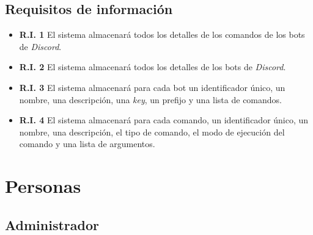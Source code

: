 \subsection{Requisitos de información}

\begin{itemize}
	\item \textbf{R.I. 1} El sistema almacenará todos los detalles de los comandos de los bots de \textit{Discord}.
	\item \textbf{R.I. 2} El sistema almacenará todos los detalles de los bots de \textit{Discord}.
	\item \textbf{R.I. 3} El sistema almacenará para cada bot un identificador único, un nombre, una descripción, una \textit{key}, un prefijo y una lista de comandos.
	\item \textbf{R.I. 4} El sistema almacenará para cada comando, un identificador único, un nombre, una descripción, el tipo de comando, el modo de ejecución del comando y una lista de argumentos.
\end{itemize}


\section{Personas}

\subsection{Administrador}
\label{sec:personaAdmin}

